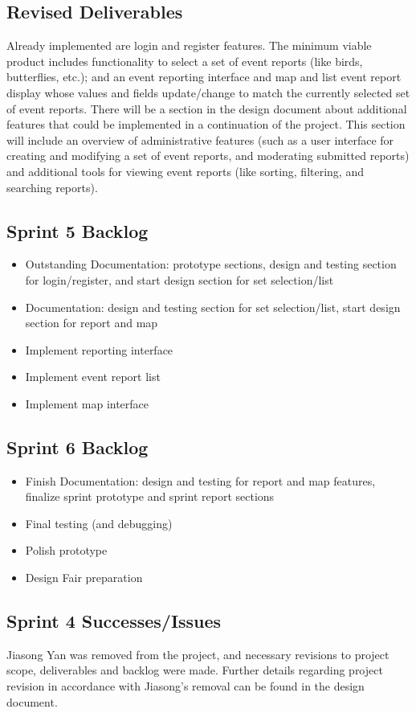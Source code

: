 \subsection{Revised Deliverables}
Already implemented are login and register features.
The minimum viable product includes functionality to select a set of event reports (like birds, butterflies, etc.); and an event reporting interface and map and list event report display whose values and fields update/change to match the currently selected set of event reports.
There will be a section in the design document about additional features that could be implemented in a continuation of the project. This section will include an overview of administrative features (such as a user interface for creating and modifying a set of event reports, and moderating submitted reports) and additional tools for viewing event reports (like sorting, filtering, and searching reports). 

\subsection{Sprint 5 Backlog}
\begin{itemize}
\item Outstanding Documentation: prototype sections, design and testing section for login/register, and start design section for set selection/list
\item Documentation: design and testing section for set selection/list, start design section for report and map
\item Implement reporting interface
\item Implement event report list
\item Implement map interface
\end{itemize}

\subsection{Sprint 6 Backlog}
\begin{itemize}
\item Finish Documentation: design and testing for report and map features, finalize sprint prototype and sprint report sections
\item Final testing (and debugging)
\item Polish prototype
\item Design Fair preparation
\end{itemize}

\subsection{Sprint 4 Successes/Issues}
Jiasong Yan was removed from the project, and necessary revisions to project scope, deliverables and backlog were made. Further details regarding project revision in accordance with Jiasong's removal can be found in the design document.